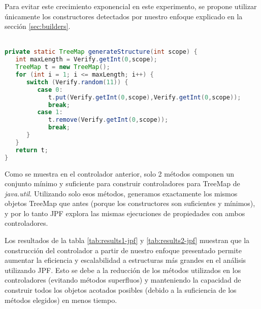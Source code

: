 Para evitar este crecimiento exponencial en este experimento, se propone utilizar únicamente los constructores detectados por nuestro enfoque explicado en la sección \ref{sec:builders}.
\\
\\
\begin{lstlisting}[caption={Controlador con métodos constructores},label={lst:driverBLD},language=Java,captionpos=b]
private static TreeMap generateStructure(int scope) {
   int maxLength = Verify.getInt(0,scope);
   TreeMap t = new TreeMap();
   for (int i = 1; i <= maxLength; i++) {
      switch (Verify.random(11)) {
         case 0:
            t.put(Verify.getInt(0,scope),Verify.getInt(0,scope));
            break;
         case 1:
            t.remove(Verify.getInt(0,scope));
            break;						
      }
   }
   return t;
}
\end{lstlisting}

Como se muestra en el controlador anterior, solo 2 métodos componen un conjunto mínimo y suficiente para construir controladores para TreeMap de \textit{java.util}. Utilizando solo esos métodos, generamos exactamente los mismos objetos TreeMap que antes (porque los constructores son suficientes y mínimos), y por lo tanto JPF explora las mismas ejecuciones de propiedades con ambos controladores.

Los resultados de la tabla \ref{tab:results1-jpf} y \ref{tab:results2-jpf} muestran que la construcción del controlador a partir de nuestro enfoque presentado permite aumentar la eficiencia y escalabilidad a estructuras más grandes en el análisis utilizando JPF. Esto se debe a la reducción de los métodos utilizados en los controladores (evitando métodos superfluos) y manteniendo la capacidad de construir todos los objetos acotados posibles (debido a la suficiencia de los métodos elegidos) en menos tiempo.




